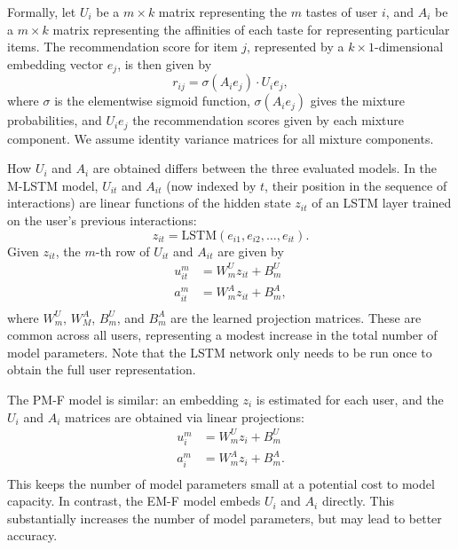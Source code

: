 \documentclass[sigchi]{acmart}
\begin{document}
Formally, let $U_i$ be a $m \times k$ matrix representing the $m$ tastes of user $i$, and $A_i$ be a $m \times k$ matrix representing the affinities of each taste for representing particular items. The recommendation score for item $j$, represented by a $k \times 1$-dimensional embedding vector $e_j$, is then given by
\begin{equation}
  r_{ij} = \sigma\left(A_ie_j\right) \cdot U_ie_j,
\end{equation}
where $\sigma$ is the elementwise sigmoid function, $\sigma\left(A_ie_j\right)$ gives the mixture probabilities, and $U_ie_j$ the recommendation scores given by each mixture component. We assume identity variance matrices for all mixture components.

How $U_i$ and $A_i$ are obtained differs between the three evaluated models. In the M-LSTM model, $U_{it}$ and $A_{it}$ (now indexed by $t$, their position in the sequence of interactions) are linear functions of the hidden state $z_{it}$ of an LSTM layer trained on the user's previous interactions:
\begin{equation}
  \label{eq:lstm}
  z_{it} = \mathrm{LSTM}\left(e_{i1}, e_{i2}, \ldots, e_{it}\right).
\end{equation}
Given $z_{it}$, the $m$-th row of $U_{it}$ and $A_{it}$ are given by
\begin{equation}
\begin{aligned}
  u^m_{it} &= W^U_mz_{it} + B^U_m\\
  a^m_{it} &= W^A_mz_{it} + B^A_m,\\
\end{aligned}
\end{equation}
where $W^U_m$, $W^A_M$, $B^U_m$, and $B^A_m$ are the learned projection matrices. These are common across all users, representing a modest increase in the total number of model parameters. Note that the LSTM network only needs to be run once to obtain the full user representation.

The PM-F model is similar: an embedding $z_i$ is estimated for each user, and the $U_i$ and $A_i$ matrices are obtained via linear projections:
\begin{equation}
\begin{aligned}
  u^m_{i} &= W^U_mz_{i} + B^U_m\\
  a^m_{i} &= W^A_mz_{i} + B^A_m.\\
\end{aligned}
\end{equation}
This keeps the number of model parameters small at a potential cost to model capacity. In contrast, the EM-F model embeds $U_i$ and $A_i$ directly. This substantially increases the number of model parameters, but may lead to better accuracy.
\end{document}
